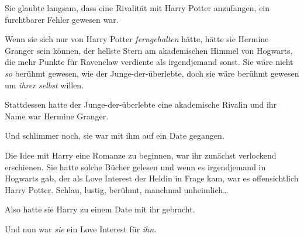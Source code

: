 Sie glaubte langsam, dass eine Rivalität mit Harry Potter anzufangen, ein furchtbarer Fehler gewesen war.

Wenn sie sich nur von Harry Potter \emph{ferngehalten} hätte, hätte sie Hermine Granger sein können, der hellste Stern am akademischen Himmel von Hogwarts, die mehr Punkte für Ravenclaw verdiente als irgendjemand sonst. Sie wäre nicht \emph{so} berühmt gewesen, wie der Junge-der-überlebte, doch sie wäre berühmt gewesen um \emph{ihrer selbst} willen.

Stattdessen hatte der Junge-der-überlebte eine akademische Rivalin und ihr Name war Hermine Granger.

Und schlimmer noch, sie war mit ihm auf ein Date gegangen.

Die Idee mit Harry eine Romanze zu beginnen, war ihr zunächst verlockend erschienen. Sie hatte solche Bücher gelesen und wenn es irgendjemand in Hogwarts gab, der als Love Interest der Heldin in Frage kam, war es offensichtlich Harry Potter. Schlau, lustig, berühmt, manchmal unheimlich…

Also hatte sie Harry zu einem Date mit ihr gebracht.

Und nun war \emph{sie} ein Love Interest für \emph{ihn}.

